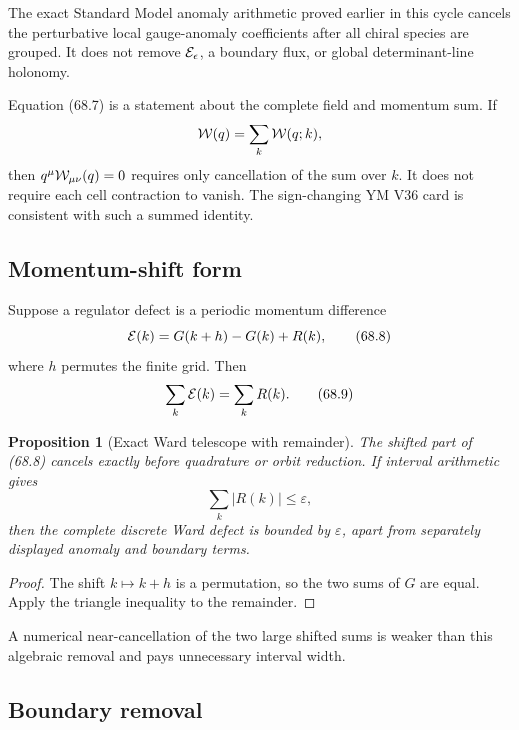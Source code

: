 \documentclass[11pt]{article}
\newtheorem{proposition}[theorem]{Proposition}
\begin{document}
The exact Standard Model anomaly arithmetic proved earlier in this
cycle cancels the perturbative local gauge-anomaly coefficients after
all chiral species are grouped.  It does not remove
\({\cal E}_\epsilon\), a boundary flux, or global determinant-line
holonomy.

\begin{warning}
\label{warn:v11v68-cell}
Equation (68.7) is a statement about the complete field and momentum
sum.  If
\[
                              {\cal W}(q)=\sum_k{\cal W}(q;k),
\]
then \(q^\mu{\cal W}_{\mu\nu}(q)=0\) requires only cancellation of the
sum over \(k\).  It does not require each cell contraction to vanish.
The sign-changing YM V36 card is consistent with such a summed
identity.
\end{warning}

\subsection{Momentum-shift form}

Suppose a regulator defect is a periodic momentum difference
\[
                   {\cal E}(k)=G(k+h)-G(k)+R(k),              \tag{68.8}
\]
where \(h\) permutes the finite grid.  Then
\[
                         \sum_k{\cal E}(k)=\sum_kR(k).         \tag{68.9}
\]

\begin{proposition}[Exact Ward telescope with remainder]
\label{prop:v11v68-momentum}
The shifted part of (68.8) cancels exactly before quadrature or orbit
reduction.  If interval arithmetic gives
\[
                              \sum_k|R(k)|\le\varepsilon,      \tag{68.10}
\]
then the complete discrete Ward defect is bounded by
\(\varepsilon\), apart from separately displayed anomaly and boundary
terms.
\end{proposition}

\begin{proof}
The shift \(k\mapsto k+h\) is a permutation, so the two sums of \(G\)
are equal.  Apply the triangle inequality to the remainder.
\end{proof}

A numerical near-cancellation of the two large shifted sums is weaker
than this algebraic removal and pays unnecessary interval width.

\subsection{Boundary removal}
\end{document}
